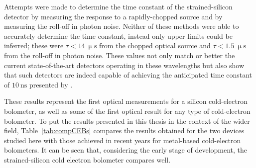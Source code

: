 \par 
Attempts were made to determine the time constant of the strained-silicon detector by measuring the response to a rapidly-chopped source and by measuring the roll-off in photon noise. Neither of these methods were able to accurately determine the time constant, instead only upper limits could be inferred; these were $\tau < 14~\mathrm{\upmu s}$ from the chopped optical source and $\tau < 1.5~\mathrm{\upmu s}$ from the roll-off in photon noise. These values not only match or better the current state-of-the-art detectors operating in these wavelengths \parencite[e.g.][]{Zhang2015,deVisser2014,Karasik2011} but also show that such detectors are indeed capable of achieving the anticipated time constant of $10~\mathrm{ns}$ presented by \textcite{Kuzmin2004}.
\par 
These results \parencite[which have been, in part, previously published in][]{Brien2014} represent the first optical measurements for a silicon cold-electron bolometer, as well as some of the first optical result for any type of cold-electron bolometer. To put the results presented in this thesis in the context of the wider field, Table~\ref{tab:compCEBs} compares the results obtained for the two devices studied here with those achieved in recent years for metal-based cold-electron bolometers. It can be seen that, considering the early stage of development, the strained-silicon cold electron bolometer compares well.
